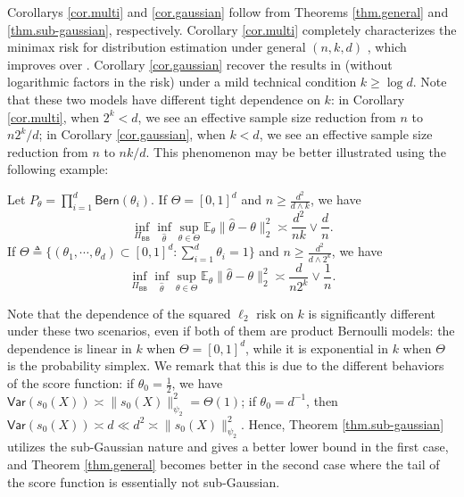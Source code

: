 \documentclass[final,12pt]{colt2018} %
\def \bE {\mathbb{E}}
\def \var {\mathsf{Var}}
\begin{document}
Corollarys \ref{cor.multi} and \ref{cor.gaussian} follow from Theorems \ref{thm.general} and \ref{thm.sub-gaussian}, respectively. Corollary \ref{cor.multi} completely characterizes the minimax risk for distribution estimation under general $(n,k,d)$ \cite{han2018distributed}, which improves over \cite{diakonikolas2017communication}. Corollary \ref{cor.gaussian} recover the results in \cite{zhang2013information,garg2014communication} (without logarithmic factors in the risk) under a mild technical condition $k\ge \log d$. Note that these two models have different tight dependence on $k$: in Corollary \ref{cor.multi}, when $2^k<d$, we see an effective sample size reduction from $n$ to $n2^k/d$; in Corollary \ref{cor.gaussian}, when $k<d$, we see an effective sample size reduction from $n$ to $nk/d$. This phenomenon may be better illustrated using the following example: 


\begin{proposition}\label{prop.bernoulli}
	Let $P_\theta=\prod_{i=1}^d \mathsf{Bern}(\theta_i)$. If $\Theta=[0,1]^d$ and $n\ge \frac{d^2}{d\wedge k}$, we have
$$
		\inf_{\Pi_{\mathsf{BB}}}\inf_{\hat{\theta}}\sup_{\theta\in\Theta} \bE_{\theta}\|\hat{\theta}-\theta\|_2^2 \asymp \frac{d^2}{nk} \vee \frac{d}{n}. 
$$
If $\Theta\triangleq \{(\theta_1,\cdots,\theta_d)\subset [0,1]^d: \sum_{i=1}^d \theta_i=1 \}$ and $n\ge \frac{d^2}{d\wedge 2^k}$, we have
$$
		\inf_{\Pi_{\mathsf{BB}}}\inf_{\hat{\theta}}\sup_{\theta\in\Theta} \bE_{\theta}\|\hat{\theta}-\theta\|_2^2 \asymp \frac{d}{n2^k} \vee \frac{1}{n}.
$$
\end{proposition}

Note that the dependence of the squared $\ell_2$ risk on $k$ is significantly different under these two scenarios, even if both of them are product Bernoulli models: the dependence is linear in $k$ when $\Theta=[0,1]^d$, while it is exponential in $k$ when $\Theta$ is the probability simplex. We remark that this is due to the different behaviors of the score function: if $\theta_0=\frac{1}{2}$, we have  $\var(s_{0}(X))\asymp \|s_{0}(X)\|_{\psi_2}^2=\Theta(1)$; if $\theta_0=d^{-1}$, then $\var(s_{0}(X))\asymp d\ll d^2\asymp \|s_{0}(X)\|_{\psi_2}^2$. Hence, Theorem \ref{thm.sub-gaussian} utilizes the sub-Gaussian nature and gives a better lower bound in the first case, and Theorem \ref{thm.general} becomes better in the second case where the tail of the score function is essentially not sub-Gaussian. 
\end{document}
